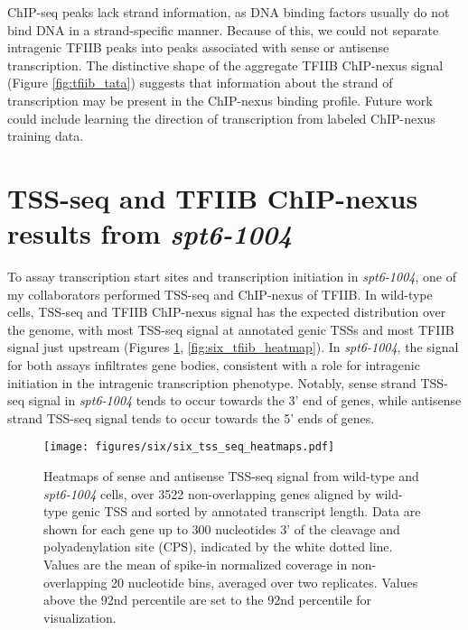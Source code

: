ChIP-seq peaks lack strand information, as DNA binding factors usually do not bind DNA in a strand-specific manner.
Because of this, we could not separate intragenic TFIIB peaks into peaks associated with sense or antisense transcription.
The distinctive shape of the aggregate TFIIB ChIP-nexus signal (Figure \ref{fig:tfiib_tata}) suggests that information about the strand of transcription may be present in the ChIP-nexus binding profile.
Future work could include learning the direction of transcription from labeled ChIP-nexus training data.

\section{TSS-seq and TFIIB ChIP-nexus results from \textit{spt6-1004}}

To assay transcription start sites and transcription initiation in \textit{spt6-1004}, one of my collaborators performed TSS-seq and ChIP-nexus of TFIIB.
In wild-type cells, TSS-seq and TFIIB ChIP-nexus signal has the expected distribution over the genome, with most TSS-seq signal at annotated genic TSSs and most TFIIB signal just upstream (Figures \ref{fig:six_tss_seq_heatmaps}, \ref{fig:six_tfiib_heatmap}).
In \textit{spt6-1004}, the signal for both assays infiltrates gene bodies, consistent with a role for intragenic initiation in the intragenic transcription phenotype.
Notably, sense strand TSS-seq signal in \textit{spt6-1004} tends to occur towards the 3' end of genes, while antisense strand TSS-seq signal tends to occur towards the 5' ends of genes.

\begin{figure}[H]
\centering
\texttt{[image: figures/six/six\_tss\_seq\_heatmaps.pdf]}
\caption[Heatmaps of sense and antisense TSS-seq signal over non-overlapping coding genes, from wild-type and \textit{spt6-1004} cells, both after 80 minutes at 37\textdegree C.]{Heatmaps of sense and antisense TSS-seq signal from wild-type and \textit{spt6-1004} cells, over 3522 non-overlapping genes aligned by wild-type genic TSS and sorted by annotated transcript length. Data are shown for each gene up to 300 nucleotides 3' of the cleavage and polyadenylation site (CPS), indicated by the white dotted line. Values are the mean of spike-in normalized coverage in non-overlapping 20 nucleotide bins, averaged over two replicates. Values above the 92nd percentile are set to the 92nd percentile for visualization.}
\label{fig:six_tss_seq_heatmaps}
\end{figure}

